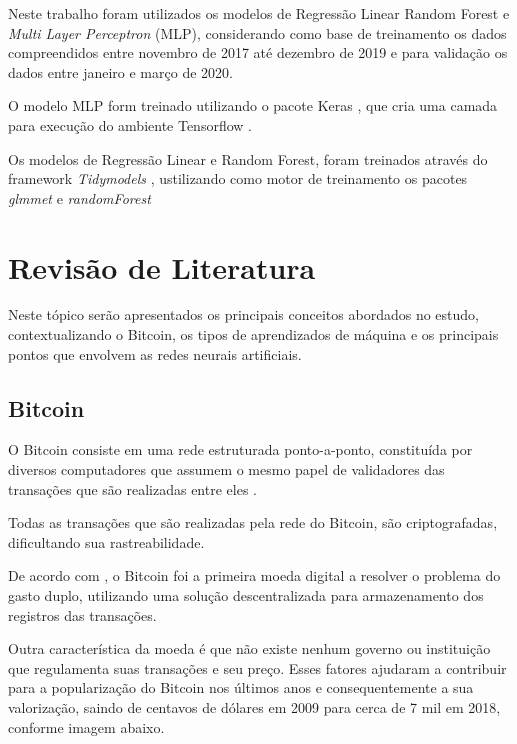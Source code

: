 \documentclass[12pt]{article}
\begin{document}
Neste trabalho foram utilizados os modelos de Regressão Linear Random Forest e 
\textit{Multi Layer Perceptron} (MLP), considerando como base de treinamento
os dados compreendidos entre novembro de 2017 até dezembro de 2019 e para 
validação os dados entre janeiro e março de 2020.

O modelo MLP form treinado utilizando o pacote Keras \cite{chollet2015}, que 
cria uma camada para execução do ambiente Tensorflow \cite{tensorflow2015}.

Os modelos de Regressão Linear e Random Forest, foram treinados através do
framework \textit{Tidymodels} \cite{tidymodels}, ustilizando como motor de 
treinamento os pacotes \textit{glmmet} \cite{glmnet} e \textit{randomForest} 
\cite{randomforest}

\section{Revisão de Literatura}

Neste tópico serão apresentados os principais conceitos abordados no estudo,
contextualizando o Bitcoin, os tipos de aprendizados de máquina e os principais 
pontos que envolvem as redes neurais artificiais.

\subsection{Bitcoin}

O Bitcoin consiste em uma rede estruturada ponto-a-ponto, constituída por 
diversos computadores que assumem o mesmo papel de validadores das transações 
que são realizadas entre eles \cite{nakamoto2019bitcoin}.

Todas as transações que são realizadas pela rede do Bitcoin, são criptografadas,
dificultando sua rastreabilidade.

De acordo com \cite{shawn:2017}, o Bitcoin foi a primeira moeda digital a 
resolver o problema do gasto duplo, utilizando uma solução descentralizada para 
armazenamento dos registros das transações.

Outra característica da moeda é que não existe nenhum governo ou instituição que
regulamenta suas transações e seu preço. Esses fatores ajudaram a contribuir 
para a popularização do Bitcoin nos últimos anos e consequentemente a sua 
valorização, saindo de centavos de dólares em 2009 para cerca de 7 mil em 2018, 
conforme imagem abaixo.
\end{document}
